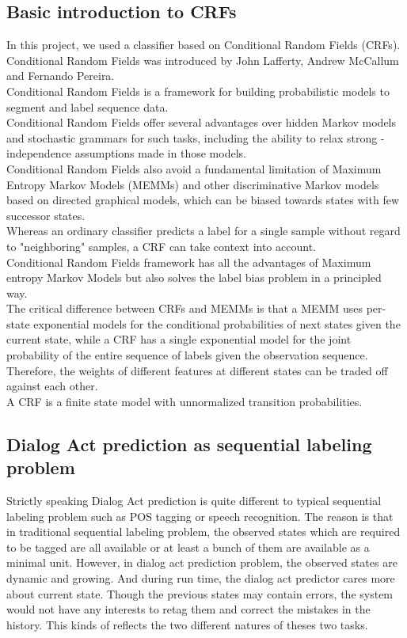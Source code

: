 \documentclass[a4paper]{article}
\begin{document}
\subsection{Basic introduction to CRFs}
In this project, we used a classifier based on Conditional Random Fields (CRFs).\\
Conditional Random Fields was introduced by John Lafferty, Andrew McCallum and Fernando Pereira.\\
Conditional Random Fields is a framework for building probabilistic models to segment and label sequence data.\\
Conditional Random Fields offer several advantages over hidden Markov models and stochastic grammars for such tasks, including the ability to relax strong -independence assumptions made in those models.\\
Conditional Random Fields also avoid a fundamental limitation of Maximum Entropy Markov Models (MEMMs) and other discriminative Markov models based on directed graphical models, which can be biased towards states with few successor states.\\
Whereas an ordinary classifier predicts a label for a single sample without regard to "neighboring" samples, a CRF can take context into account.\\
Conditional Random Fields framework has all the advantages of Maximum entropy Markov Models but also solves the label bias problem in a principled way.\\
The critical difference between CRFs and MEMMs is that a MEMM uses per-state exponential models for the conditional probabilities of next states given the current state, while a CRF has a single exponential model for the joint probability of the entire sequence of labels given the observation sequence. Therefore, the weights of different features at different states can be traded off against each other.\\
A CRF is a finite state model with unnormalized transition probabilities.
\subsection{Dialog Act prediction as sequential labeling problem}
Strictly speaking Dialog Act prediction is quite different to typical sequential labeling problem such as POS tagging or speech recognition. The reason is that in traditional sequential labeling problem, the observed states which are required to be tagged are all available or at least a bunch of them are available as a minimal unit. However, in dialog act prediction problem, the observed states are dynamic and growing. And during run time, the dialog act predictor cares more about current state. Though the previous states may contain errors, the system would not have any interests to retag them and correct the mistakes in the history. This kinds of reflects the two different natures of theses two tasks.
\end{document}
